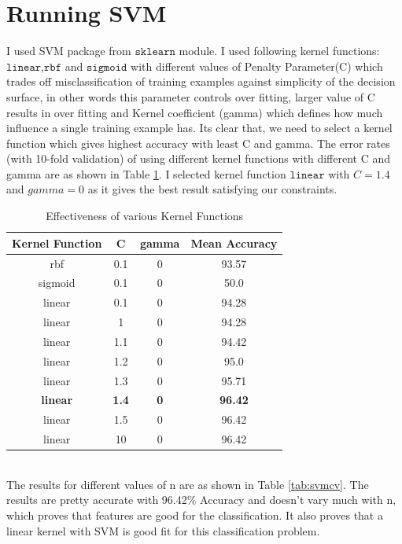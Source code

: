 \documentclass[11pt, pdftex]{article}
\begin{document}
\section{Running SVM}
I used SVM package from $\texttt{sklearn}$ module. I used following kernel functions: $\texttt{linear,rbf}$ and   $\texttt{sigmoid}$ with different values of Penalty Parameter(C) which trades off misclassification of training examples against simplicity of the decision surface, in other words this parameter controls over fitting, larger value of C results in over fitting and Kernel coefficient (gamma) which defines how much influence a single training example has. Its clear that, we need to select a kernel function which gives highest accuracy with least C and gamma. The error rates (with 10-fold validation) of using different kernel functions with different C and gamma are as shown in Table \ref{tab:kerf}. I selected kernel function $\texttt{linear}$ with $C = 1.4$ and $gamma = 0$ as it gives the best result satisfying our constraints.
\begin{table}
\centering
\begin{tabular}{ | c | c | c | c |}
    \hline
    {\bf Kernel Function} & {\bf C} & {\bf gamma} & {\bf Mean Accuracy}\\ 
    \hline
    rbf & 0.1 & 0 & 93.57\\
	\hline
	sigmoid & 0.1 & 0 & 50.0\\
	\hline
	linear & 0.1 & 0 & 94.28\\
	\hline
	linear & 1 & 0 & 94.28 \\
	\hline
	linear & 1.1 & 0 & 94.42\\
	\hline
	linear & 1.2 & 0 & 95.0\\
	\hline
	linear & 1.3 & 0 & 95.71\\
	\hline
	{\bf linear} & {\bf 1.4} & {\bf 0} & {\bf 96.42}\\
	\hline
	linear & 1.5 & 0 & 96.42\\
	\hline
	linear & 10 & 0 & 96.42\\
	\hline
	\end{tabular}
	\caption{Effectiveness of various Kernel Functions}
    \label{tab:kerf}
\end{table}
\\
The results for different values of n are as shown in Table \ref{tab:svmcv}. The results are pretty accurate with 96.42$\%$ Accuracy and doesn't vary much with n, which proves that features are good for the classification. It also proves that a linear kernel with SVM is good fit for this classification problem.
\end{document}
